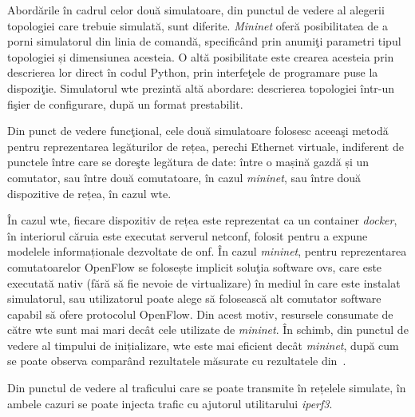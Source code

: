 Abordările în cadrul celor două simulatoare, din punctul de vedere al alegerii topologiei care trebuie simulată, sunt diferite. \textit{Mininet} oferă posibilitatea de a porni simulatorul din linia de comandă, specificând prin anumiţi parametri tipul topologiei și dimensiunea acesteia. O altă posibilitate este crearea acesteia prin descrierea lor direct în codul Python, prin interfeţele de programare puse la dispoziţie. Simulatorul \gls{wte} prezintă altă abordare: descrierea topologiei într-un fişier de configurare, după un format prestabilit.

Din punct de vedere funcţional, cele două simulatoare folosesc aceeaşi metodă pentru reprezentarea legăturilor de rețea, perechi Ethernet virtuale, indiferent de punctele între care se doreşte legătura de date: între o mașină gazdă și un comutator, sau între două comutatoare, în cazul \textit{mininet}, sau între două dispozitive de rețea, în cazul \gls{wte}.

În cazul \gls{wte}, fiecare dispozitiv de rețea este reprezentat ca un container \textit{docker}, în interiorul căruia este executat serverul \gls{netconf}, folosit pentru a expune modelele informaționale dezvoltate de \gls{onf}. În cazul \textit{mininet}, pentru reprezentarea comutatoarelor OpenFlow se folosește implicit soluţia software \gls{ovs}, care este executată nativ (fără să fie nevoie de virtualizare) în mediul în care este instalat simulatorul, sau utilizatorul poate alege să folosească alt comutator software capabil să ofere protocolul OpenFlow. Din acest motiv, resursele consumate de către \gls{wte} sunt mai mari decât cele utilizate de \textit{mininet}. În schimb, din punctul de vedere al timpului de inițializare, \gls{wte} este mai eficient decât \textit{mininet}, după cum se poate observa comparând rezultatele măsurate cu rezultatele din~\cite{lantz2010network}.

Din punctul de vedere al traficului care se poate transmite în rețelele simulate, în ambele cazuri se poate injecta trafic cu ajutorul utilitarului \textit{iperf3}.